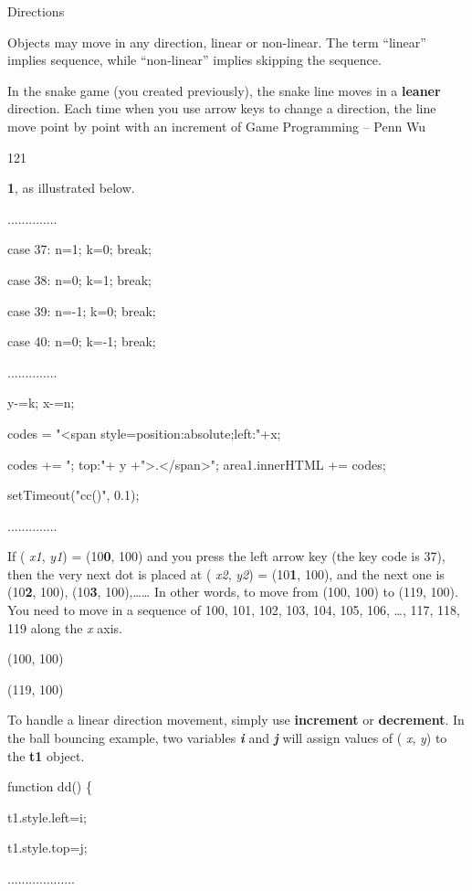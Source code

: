 \documentclass[
]{article}
\begin{document}
Directions

Objects may move in any direction, linear or non-linear. The term
``linear'' implies sequence, while ``non-linear'' implies skipping the
sequence.

In the snake game (you created previously), the snake line moves in a
\textbf{leaner} direction. Each time when you use arrow keys to change a
direction, the line move point by point with an increment of Game
Programming -- Penn Wu

121

\protect\hypertarget{index_split_008.htmlux5cux23p122}{}{}\textbf{1}, as
illustrated below.

..............

case 37: n=1; k=0; break;

case 38: n=0; k=1; break;

case 39: n=-1; k=0; break;

case 40: n=0; k=-1; break;

..............

y-=k; x-=n;

codes = "\textless span
style=\textquotesingle position:absolute;left:"+x;

codes += "; top:"+ y
+"\textquotesingle\textgreater.\textless/span\textgreater";
area1.innerHTML += codes;

setTimeout("cc()", 0.1);

..............

If ( \emph{x1}, \emph{y1}) = (10\textbf{0}, 100) and you press the left
arrow key (the key code is 37), then the very next dot is placed at (
\emph{x2}, \emph{y2}) = (10\textbf{1}, 100), and the next one is
(10\textbf{2}, 100), (10\textbf{3}, 100),\ldots\ldots{} In other words,
to move from (100, 100) to (119, 100). You need to move in a sequence of
100, 101, 102, 103, 104, 105, 106, \ldots, 117, 118, 119 along the
\emph{x} axis.

(100, 100)

(119, 100)

To handle a linear direction movement, simply use \textbf{increment} or
\textbf{decrement}. In the ball bouncing example, two variables
\emph{\textbf{i}} and \emph{\textbf{j}} will assign values of (
\emph{x}, \emph{y}) to the \textbf{t1} object.

function dd() \{

t1.style.left=i;

t1.style.top=j;

...................
\end{document}
